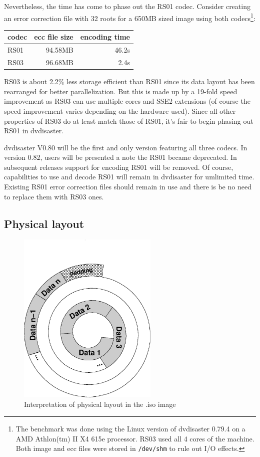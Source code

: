 \smallskip

Nevertheless, the time has come to phase out the RS01 codec.
Consider creating an error correction file with 32 roots 
for a 650MB sized image using both  codecs\footnote{The benchmark was done using the Linux version 
of dvdisaster 0.79.4 on a AMD Athlon(tm) II X4 615e 
processor. RS03 used all 4 cores of the machine.
Both image and ecc files were stored in {\tt /dev/shm}
to rule out I/O effects.}:

\begin{center}
\begin{tabular}{|l|r|r|}
\hline
codec & ecc file size & encoding time \\
\hline
RS01 & 94.58MB & 46.2s \\
RS03 & 96.68MB &  2.4s \\
\hline
\end{tabular}
\end{center}

RS03 is about 2.2\% less storage efficient than RS01 since
its data layout has been rearranged for better parallelization.
But this is made up by a 19-fold speed improvement as
RS03 can use multiple cores and SSE2 extensions
(of course the speed improvement varies depending on the
hardware used).
Since all other properties of RS03 do at least match those
of RS01, it's fair to begin phasing out RS01 in dvdisaster.


dvdisaster V0.80 will be the first and only version 
featuring all three codecs. In version 0.82, users
will be presented a note the RS01 became deprecated.
In subsequent releases support for encoding RS01 will
be removed. Of course, capabilities to use and decode
RS01 will remain in dvdisaster for umlimited time.
Existing RS01 error correction files should remain in use
and there is be no need to replace them with RS03 ones.

\subsection{Physical layout}

\begin{figure}
 \begin{center}
 \includegraphics[width=67mm]{spiral-rs01.eps}
 \caption{Interpretation of physical layout in the .iso image}
 \label{layout-phy-one}
 \end{center}
\end{figure}

